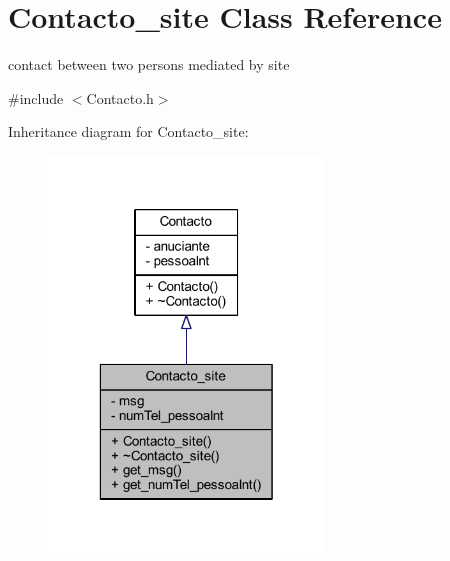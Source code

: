 \hypertarget{class_contacto__site}{}\section{Contacto\+\_\+site Class Reference}
\label{class_contacto__site}


contact between two persons mediated by site  




{\ttfamily \#include $<$Contacto.\+h$>$}



Inheritance diagram for Contacto\+\_\+site\+:\nopagebreak
\begin{figure}[H]
\begin{center}
\leavevmode
\includegraphics[width=208pt]{class_contacto__site__inherit__graph}
\end{center}
\end{figure}


